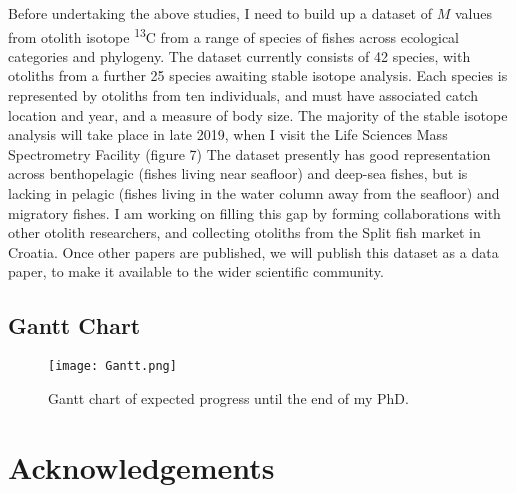 \documentclass[12pt, titlepage]{article}
\begin{document}
Before undertaking the above studies, I need to build up a dataset of $M$ values from otolith isotope \textdelta \textsuperscript{13}C from a range of species of fishes across ecological categories and phylogeny.
The dataset currently consists of 42 species, with otoliths from a further 25 species awaiting stable isotope analysis.
Each species is represented by otoliths from ten individuals, and must have associated catch location and year, and a measure of body size.
The majority of the stable isotope analysis will take place in late 2019, when I visit the Life Sciences Mass Spectrometry Facility (figure 7) %
The dataset presently has good representation across benthopelagic (fishes living near seafloor) and deep-sea fishes, but is lacking in pelagic (fishes living in the water column away from the seafloor) and migratory fishes.
I am working on filling this gap by forming collaborations with other otolith researchers, and collecting otoliths from the Split fish market in Croatia.
Once other papers are published, we will publish this dataset as a data paper, to make it available to the wider scientific community.

\pagebreak
\begin{landscape}
\subsection{Gantt Chart}

\begin{figure}[H]
\texttt{[image: Gantt.png]}
\caption{Gantt chart of expected progress until the end of my PhD.}
\end{figure}

\end{landscape}

\pagebreak
\section{Acknowledgements}
\end{document}
